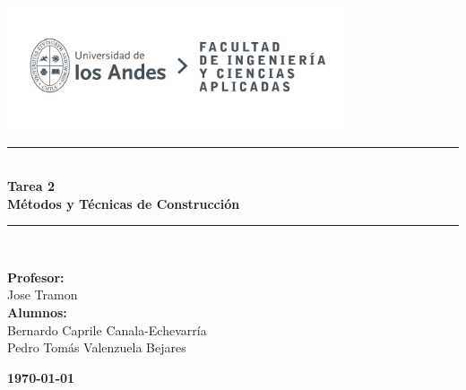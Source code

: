 \documentclass{article} %
\begin{document}
\begin{titlepage}%
\newcommand{\HRule}{\rule{\linewidth}{0.5mm}} 
\center 
\includegraphics[width=10cm]{LOGO_UNIVERSIDAD.jpg}\\ %
\vspace{3cm}
\HRule \\[0.4cm]
{ \huge \bfseries Tarea 2}\\[0.4cm] %
{ \huge \bfseries Métodos y Técnicas de Construcción}\\[0.4cm] %
\HRule \\[1.5cm]
 \vspace{5cm}
\begin{flushright}
    { \textbf{Profesor:}\\
    Jose Tramon\\
    \vspace{0.2cm}
    \textbf{Alumnos:}\\
    Bernardo Caprile Canala-Echevarría\\
    Pedro Tomás Valenzuela Bejares\\
    \vspace{0.2cm}

}
\end{flushright}
\vspace{1cm}
{\large \textbf{\today}}\\[2cm] %
\end{titlepage}
\end{document}
